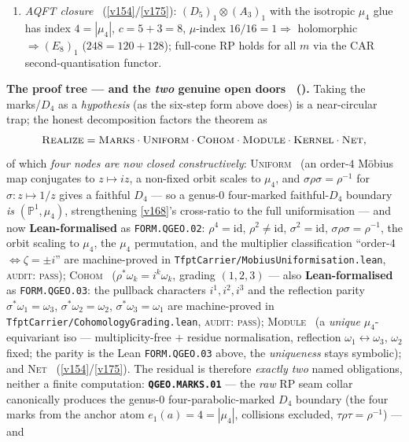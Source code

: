 \documentclass[11pt,a4paper]{article}
\newcommand{\PP}{\mathbb P^1}
\begin{document}
\begin{keybox}
\begin{enumerate}[leftmargin=2.2em,itemsep=1pt]
\item[\textbf{6}] \emph{AQFT closure} \mE\ (\vref{v154}/\vref{v175}): $(D_5)_1{\otimes}(A_3)_1$ with
  the isotropic $\mu_4$ glue has index $4=|\mu_4|$, $c=5{+}3=8$, $\mu$-index $16/16=1\Rightarrow$
  holomorphic $\Rightarrow(E_8)_1$ ($248=120{+}128$); full-cone RP holds for all $m$ via the CAR
  second-quantisation functor.
\end{enumerate}
\noindent\textbf{The proof tree --- and the \emph{two} genuine open doors \mO\
().} Taking the marks/$D_4$ as a \emph{hypothesis} (as the
six-step form above does) is a near-circular trap; the honest decomposition factors the theorem as
\[
  \textsc{Realize}=\textsc{Marks}\cdot\textsc{Uniform}\cdot\textsc{Cohom}\cdot\textsc{Module}\cdot
  \textsc{Kernel}\cdot\textsc{Net},
\]
of which \emph{four nodes are now closed constructively}: \textsc{Uniform} \mE\ (an order-$4$
M\"obius map conjugates to $z\mapsto iz$, a non-fixed orbit scales to $\mu_4$, and
$\sigma\rho\sigma=\rho^{-1}$ for $\sigma:z\mapsto1/z$ gives a faithful $D_4$ --- so a genus-$0$
four-marked faithful-$D_4$ boundary \emph{is} $(\PP,\mu_4)$, strengthening \vref{v168}'s cross-ratio
to the full uniformisation --- and now \textbf{Lean-formalised} as \texttt{FORM.QGEO.02}:
$\rho^4{=}\mathrm{id}$, $\rho^2{\neq}\mathrm{id}$, $\sigma^2{=}\mathrm{id}$,
$\sigma\rho\sigma{=}\rho^{-1}$, the orbit scaling to $\mu_4$, the $\mu_4$ permutation, and the
multiplier classification ``order-$4$ $\Leftrightarrow\zeta{=}\pm i$'' are machine-proved in
\texttt{TfptCarrier/MobiusUniformisation.lean}, \textsc{audit: pass}); \textsc{Cohom} \mE\ ($\rho^*\omega_k=i^k\omega_k$, grading
$(1,2,3)$ --- also \textbf{Lean-formalised} as \texttt{FORM.QGEO.03}: the pullback characters
$i^1,i^2,i^3$ and the reflection parity $\sigma^*\omega_1{=}\omega_3$, $\sigma^*\omega_2{=}\omega_2$,
$\sigma^*\omega_3{=}\omega_1$ are machine-proved in \texttt{TfptCarrier/CohomologyGrading.lean},
\textsc{audit: pass}); \textsc{Module} \mE\ (a \emph{unique} $\mu_4$-equivariant iso --- multiplicity-free $+$
residue normalisation, reflection $\omega_1\!\leftrightarrow\!\omega_3$, $\omega_2$ fixed; the parity is the
Lean \texttt{FORM.QGEO.03} above, the \emph{uniqueness} stays symbolic); and
\textsc{Net} \mE\ (\vref{v154}/\vref{v175}). The residual is therefore \emph{exactly two} named
obligations, neither a finite computation: \textbf{\texttt{QGEO.MARKS.01}} --- the \emph{raw} RP seam
collar canonically produces the genus-$0$ four-parabolic-marked $D_4$ boundary (the four marks from
the anchor atom $e_1(a){=}4{=}|\mu_4|$, collisions excluded, $\tau\rho\tau{=}\rho^{-1}$) --- and

\end{keybox}
\end{document}
